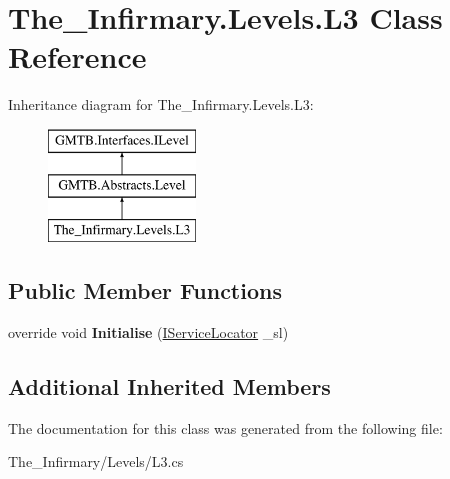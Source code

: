 \hypertarget{class_the___infirmary_1_1_levels_1_1_l3}{}\section{The\+\_\+\+Infirmary.\+Levels.\+L3 Class Reference}
\label{class_the___infirmary_1_1_levels_1_1_l3}
Inheritance diagram for The\+\_\+\+Infirmary.\+Levels.\+L3\+:\begin{figure}[H]
\begin{center}
\leavevmode
\includegraphics[height=3.000000cm]{class_the___infirmary_1_1_levels_1_1_l3}
\end{center}
\end{figure}
\subsection*{Public Member Functions}
\begin{DoxyCompactItemize}
\item 
\mbox{\label{class_the___infirmary_1_1_levels_1_1_l3_aa3f7e6218dcc9888160f80dfc48af443}} 
override void {\bfseries Initialise} (\mbox{\hyperlink{interface_g_m_t_b_1_1_interfaces_1_1_i_service_locator}{I\+Service\+Locator}} \+\_\+sl)
\end{DoxyCompactItemize}
\subsection*{Additional Inherited Members}


The documentation for this class was generated from the following file\+:\begin{DoxyCompactItemize}
\item 
The\+\_\+\+Infirmary/\+Levels/L3.\+cs\end{DoxyCompactItemize}
